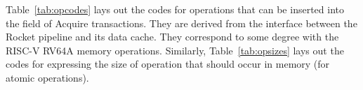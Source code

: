 Table~\ref{tab:opcodes} lays out the codes for operations
that can be inserted into the  field of Acquire transactions.
They are derived from the interface between the Rocket pipeline and its data cache.
They correspond to some degree with the RISC-V RV64A memory operations.
Similarly, Table~\ref{tab:opsizes} lays out the codes for expressing the size of operation
that should occur in memory (for atomic operations).

